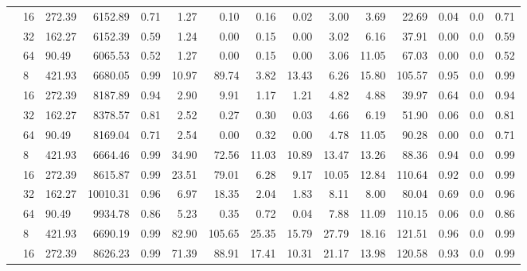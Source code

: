 \begin{table}
\begin{adjustwidth}{-1cm}{}
{\begin{tabular}{lllrrrrrrrrrrrr}
                                & 16 & 272.39 & 6152.89   & 0.71   & 1.27   & 0.10   & 0.16  & 0.02  & 3.00  & 3.69  & 22.69           & 0.04      & 0.0   & 0.71 \\
                                & 32 & 162.27 & 6152.39   & 0.59   & 1.24   & 0.00   & 0.15  & 0.00  & 3.02  & 6.16  & 37.91           & 0.00      & 0.0   & 0.59 \\
                                & 64 & 90.49  & 6065.53   & 0.52   & 1.27   & 0.00   & 0.15  & 0.00  & 3.06  & 11.05 & 67.03           & 0.00      & 0.0   & 0.52 \\
                        \addlinespace
                        48      & 8  & 421.93 & 6680.05   & 0.99   & 10.97  & 89.74  & 3.82  & 13.43 & 6.26  & 15.80 & 105.57          & 0.95      & 0.0   & 0.99 \\
                                & 16 & 272.39 & 8187.89   & 0.94   & 2.90   & 9.91   & 1.17  & 1.21  & 4.82  & 4.88  & 39.97           & 0.64      & 0.0   & 0.94 \\
                                & 32 & 162.27 & 8378.57   & 0.81   & 2.52   & 0.27   & 0.30  & 0.03  & 4.66  & 6.19  & 51.90           & 0.06      & 0.0   & 0.81 \\
                                & 64 & 90.49  & 8169.04   & 0.71   & 2.54   & 0.00   & 0.32  & 0.00  & 4.78  & 11.05 & 90.28           & 0.00      & 0.0   & 0.71 \\
                        \addlinespace
                        96      & 8  & 421.93 & 6664.46   & 0.99   & 34.90  & 72.56  & 11.03 & 10.89 & 13.47 & 13.26 & 88.36           & 0.94      & 0.0   & 0.99 \\
                                & 16 & 272.39 & 8615.87   & 0.99   & 23.51  & 79.01  & 6.28  & 9.17  & 10.05 & 12.84 & 110.64          & 0.92      & 0.0   & 0.99 \\
                                & 32 & 162.27 & 10010.31  & 0.96   & 6.97   & 18.35  & 2.04  & 1.83  & 8.11  & 8.00  & 80.04           & 0.69      & 0.0   & 0.96 \\
                                & 64 & 90.49  & 9934.78   & 0.86   & 5.23   & 0.35   & 0.72  & 0.04  & 7.88  & 11.09 & 110.15          & 0.06      & 0.0   & 0.86 \\
                        \addlinespace
                        192     & 8  & 421.93 & 6690.19   & 0.99   & 82.90  & 105.65 & 25.35 & 15.79 & 27.79 & 18.16 & 121.51          & 0.96      & 0.0   & 0.99 \\
                                & 16 & 272.39 & 8626.23   & 0.99   & 71.39  & 88.91  & 17.41 & 10.31 & 21.17 & 13.98 & 120.58          & 0.93      & 0.0   & 0.99 \\

\end{tabular}}
\end{adjustwidth}
\end{table}
